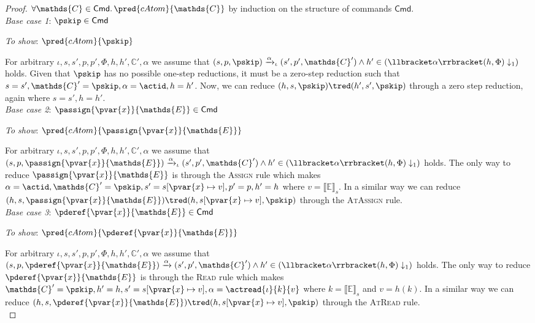 {\parindent0pt
\begin{proof}
$\forall \mathds{C} \in \mathsf{Cmd} \ldotp \pred{cAtom}{\mathds{C}}$ by induction on the structure of commands $\mathsf{Cmd}$. \\

\textit{Base case 1}: $\pskip \in \mathsf{Cmd}$

\textit{To show}: $\pred{cAtom}{\pskip}$

For arbitrary $\iota, s, s', p, p', \Phi, h, h', \mathds{C}', \alpha$ we assume that $(s, p, \pskip) \xrightarrow{\alpha}_\iota (s', p', \mathds{C}') \land h' \in \left( \llbracket \alpha \rrbracket(h, \Phi) \downarrow_1 \right)$ holds. Given that $\pskip$ has no possible one-step reductions, it must be a zero-step reduction such that $s = s', \mathds{C}' = \pskip, \alpha = \actid, h = h'$. Now, we can reduce $(h, s, \pskip) \tred (h', s', \pskip)$ through a zero step reduction, again where $s = s', h = h'$. \\

\textit{Base case 2}: $\passign{\pvar{x}}{\mathds{E}} \in \mathsf{Cmd}$

\textit{To show}: $\pred{cAtom}{\passign{\pvar{x}}{\mathds{E}}}$

For arbitrary $\iota, s, s', p, p', \Phi, h, h', \mathds{C}', \alpha$ we assume that $(s, p, \passign{\pvar{x}}{\mathds{E}}) \xrightarrow{\alpha}_\iota (s', p', \mathds{C}') \land h' \in \left( \llbracket \alpha \rrbracket(h, \Phi) \downarrow_1 \right)$ holds. The only way to reduce $\passign{\pvar{x}}{\mathds{E}}$ is through the \textsc{Assign} rule which makes $\alpha = \actid, \mathds{C}' = \pskip, s' = s[\pvar{x} \mapsto v], p' = p, h' = h$ where $v = \llbracket \mathds{E} \rrbracket_s$. In a similar way we can reduce $(h, s, \passign{\pvar{x}}{\mathds{E}}) \tred (h, s[\pvar{x} \mapsto v], \pskip)$ through the \textsc{AtAssign} rule. \\

\textit{Base case 3}: $\pderef{\pvar{x}}{\mathds{E}} \in \mathsf{Cmd}$

\textit{To show}: $\pred{cAtom}{\pderef{\pvar{x}}{\mathds{E}}}$

For arbitrary $\iota, s, s', p, p', \Phi, h, h', \mathds{C}', \alpha$ we assume that $(s, p, \pderef{\pvar{x}}{\mathds{E}}) \xrightarrow{\alpha} (s', p', \mathds{C}') \land h' \in \left( \llbracket \alpha \rrbracket(h, \Phi) \downarrow_1 \right)$ holds. The only way to reduce $\pderef{\pvar{x}}{\mathds{E}}$ is through the \textsc{Read} rule which makes $\mathds{C}' = \pskip, h' = h, s' = s[\pvar{x} \mapsto v], \alpha = \actread{\iota}{k}{v}$ where $k = \llbracket \mathds{E} \rrbracket_s$ and $v = h(k)$. In a similar way we can reduce $(h, s, \pderef{\pvar{x}}{\mathds{E}}) \tred (h, s[\pvar{x} \mapsto v], \pskip)$ through the \textsc{AtRead} rule. \\


\end{proof}}
